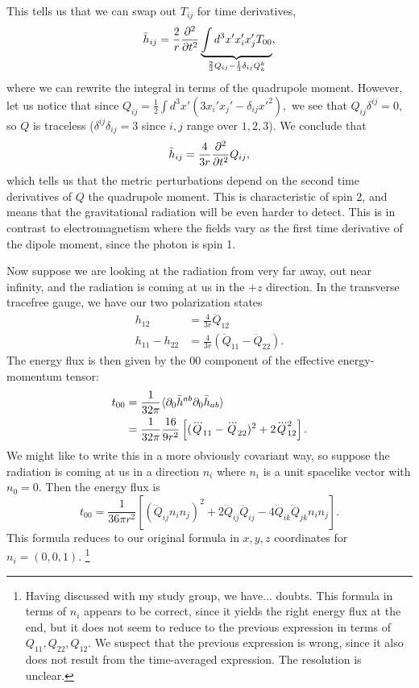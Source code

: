 This tells us that we can swap out $T_{ij}$ for time derivatives,
$$\bar h_{ij}=\frac{2}{r} \frac{\partial^2}{\partial t^2}\underbrace{\int d^3x' x_i' x_j' T_{00}}_{\frac{2}{3}Q_{ij}-\frac{1}{3}\delta_{ij} Q^k_k},$$
where we can rewrite the integral in terms of the quadrupole moment. However, let us notice that since $Q_{ij}=\frac{1}{2}\int d^3 x'(3x_i' x_j' -\delta_{ij} x'^2),$ we see that $Q_{ij}\delta^{ij}=0,$ so $Q$ is traceless ($\delta^{ij}\delta_{ij}=3$ since $i,j$ range over $1,2,3$). We conclude that
$$\bar h_{ij}=\frac{4}{3r}\frac{\partial^2}{\partial t^2} Q_{ij},$$
which tells us that the metric perturbations depend on the second time derivatives of $Q$ the quadrupole moment. This is characteristic of spin 2, and means that the gravitational radiation will be even harder to detect. This is in contrast to electromagnetism where the fields vary as the first time derivative of the dipole moment, since the photon is spin 1.

Now suppose we are looking at the radiation from very far away, out near infinity, and the radiation is coming at us in the $+z$ direction. In the transverse tracefree gauge, we have our two polarization states
\begin{align*}
    h_{12}&=\frac{4}{3r}\ddot Q_{12}\\
    h_{11}-h_{22}&=\frac{4}{3r}(\ddot Q_{11}-\ddot Q_{22}).
\end{align*}
The energy flux is then given by the $00$ component of the effective energy-momentum tensor:
\begin{align*}
    t_{00}&=\frac{1}{32\pi}\langle\partial_0 \bar h^{ab} \partial_0 \bar h_{ab}\rangle\\
    &=\frac{1}{32\pi}\frac{16}{9r^2}\left[(\dddot Q_{11}-\dddot Q_{22})^2+2\dddot Q_{12}^2\right].
\end{align*}
We might like to write this in a more obviously covariant way, so suppose the radiation is coming at us in a direction $n_i$ where $n_i$ is a unit spacelike vector with $n_0=0$. Then the energy flux is
$$t_{00}=\frac{1}{36 \pi r^2}\left[(\dddot Q_{ij} n_i n_j)^2+2 \dddot Q_{ij} \dddot Q_{ij} -4\dddot Q_{ik} \dddot Q_{jk} n_i n_j\right].$$
This formula reduces to our original formula in $x,y,z$ coordinates for $n_i=(0,0,1)$.%
    \footnote{Having discussed with my study group, we have... doubts. This formula in terms of $n_i$ appears to be correct, since it yields the right energy flux at the end, but it does not seem to reduce to the previous expression in terms of $Q_{11},Q_{22},Q_{12}$. We suspect that the previous expression is wrong, since it also does not result from the time-averaged expression. The resolution is unclear.}

